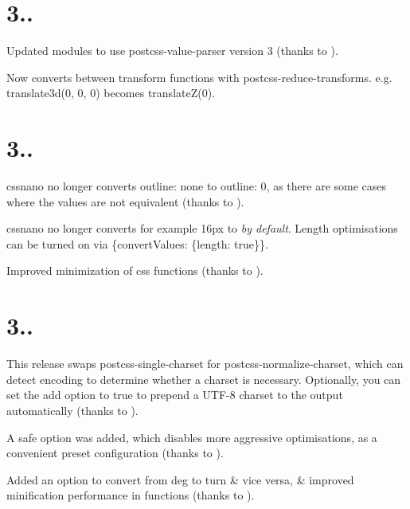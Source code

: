 \section*{3..}


\begin{DoxyItemize}
\item Updated modules to use postcss-\/value-\/parser version 3 (thanks to ).
\item Now converts between transform functions with postcss-\/reduce-\/transforms. e.\+g. {\ttfamily translate3d(0, 0, 0)} becomes {\ttfamily translate\+Z(0)}.
\end{DoxyItemize}

\section*{3..}


\begin{DoxyItemize}
\item cssnano no longer converts {\ttfamily outline\+: none} to {\ttfamily outline\+: 0}, as there are some cases where the values are not equivalent (thanks to ).
\item cssnano no longer converts for example {\ttfamily 16px} to {\ttfamily 1pc} {\itshape by default}. Length optimisations can be turned on via {\ttfamily \{convert\+Values\+: \{length\+: true\}\}}.
\item Improved minimization of css functions (thanks to ).
\end{DoxyItemize}

\section*{3..}


\begin{DoxyItemize}
\item This release swaps postcss-\/single-\/charset for postcss-\/normalize-\/charset, which can detect encoding to determine whether a charset is necessary. Optionally, you can set the {\ttfamily add} option to {\ttfamily true} to prepend a U\+T\+F-\/8 charset to the output automatically (thanks to ).
\item A {\ttfamily safe} option was added, which disables more aggressive optimisations, as a convenient preset configuration (thanks to ).
\item Added an option to convert from {\ttfamily deg} to {\ttfamily turn} \& vice versa, \& improved minification performance in functions (thanks to ).
\end{DoxyItemize}

